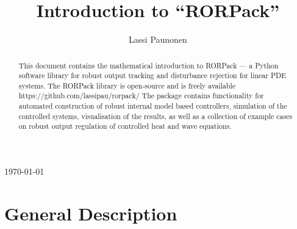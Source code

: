 \documentclass[11pt, a4paper]{amsart}
\theoremstyle{definition}
\numberwithin{equation}{section}
\newcommand{\RORname}{\textbf{RORPack}}
\newcommand{\RORnameplain}{RORPack}
\begin{document}
\title[Introduction to ``\RORnameplain'']{Introduction to ``\RORname''\\[1ex]\footnotesize{}}
\thispagestyle{plain}

\author{Lassi Paunonen}
\address{Department of Mathematics, Tampere University, PO.\ Box 692, 33101 Tampere, Finland}


\maketitle

\vspace{-3ex}

\begin{center}
  \today
\end{center}

\vspace{3ex}

\begin{abstract}
  This document contains the mathematical introduction to RORPack --- a Python software library for robust output tracking and disturbance rejection for linear PDE systems. The RORPack library is open-source and is freely available 
https://github.com/lassipau/rorpack/
The package contains functionality for automated construction of robust internal model based controllers, simulation of the controlled systems, visualisation of the results, as well as a collection of example cases on robust output regulation of controlled heat and wave equations.
\end{abstract}

{\small\tableofcontents}



\section{General Description}
\end{document}
